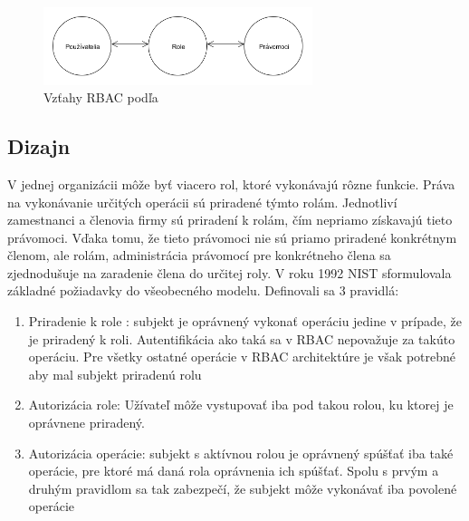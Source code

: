 \begin{figure}[H]
	\centerline{\includegraphics[width=0.7\textwidth]{images/rbac_kuhn}}
	\caption{Vzťahy RBAC podľa \cite{kuhn}}
	\label{obr:rbac_kuhn}
\end{figure}



\subsection{Dizajn}
V jednej organizácii môže byť viacero rol, ktoré vykonávajú rôzne funkcie. Práva na vykonávanie určitých operácii sú priradené týmto rolám. Jednotliví zamestnanci a členovia firmy sú priradení k rolám, čím nepriamo získavajú tieto právomoci.	Vďaka tomu, že tieto právomoci nie sú priamo priradené konkrétnym členom, ale rolám, administrácia právomocí pre konkrétneho člena sa zjednodušuje na zaradenie člena do určitej roly.
V roku 1992 NIST sformulovala základné požiadavky do všeobecného modelu.
Definovali sa 3  pravidlá:
\begin{enumerate}
		\item Priradenie k role : subjekt je oprávnený vykonať operáciu jedine v prípade, že je priradený k roli. Autentifikácia ako taká sa v RBAC nepovažuje za takúto operáciu. Pre všetky ostatné operácie v RBAC architektúre je však potrebné aby mal subjekt priradenú rolu
		\item Autorizácia role: Užívateľ môže vystupovať iba pod takou rolou, ku ktorej je oprávnene priradený.
		\item Autorizácia operácie: subjekt s aktívnou rolou je oprávnený spúšťať iba také operácie, pre ktoré má daná rola oprávnenia ich spúšťať. Spolu s prvým a druhým pravidlom sa tak zabezpečí, že subjekt môže vykonávať iba povolené operácie
\end{enumerate}

